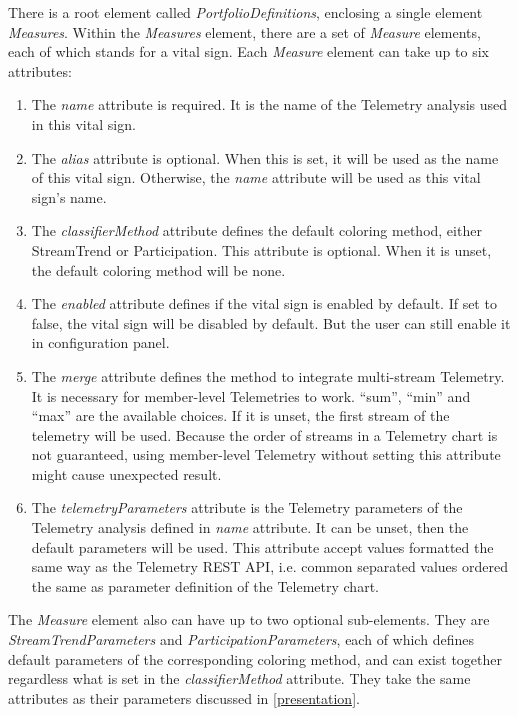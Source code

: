 There is a root element called {\it PortfolioDefinitions}, enclosing a single element {\it Measures}. Within the {\it Measures} element, there are a set of {\it Measure} elements, each of which stands for a vital sign. Each {\it Measure} element can take up to six attributes:
\begin{enumerate}
\item The {\it name} attribute is required. It is the name of the Telemetry analysis used in this vital sign.
\item The {\it alias} attribute is optional. When this is set, it will be used as the name of this vital sign. Otherwise, the {\it name} attribute will be used as this vital sign's name.
\item The {\it classifierMethod} attribute defines the default coloring method, either StreamTrend or Participation. This attribute is optional. When it is unset, the default coloring method will be none.
\item The {\it enabled} attribute defines if the vital sign is enabled by default. If set to false, the vital sign will be disabled by default. But the user can still enable it in configuration panel.
\item The {\it merge} attribute defines the method to integrate multi-stream Telemetry. It is necessary for member-level Telemetries to work. ``sum'', ``min'' and ``max'' are the available choices. If it is unset, the first stream of the telemetry will be used. Because the order of streams in a Telemetry chart is not guaranteed, using member-level Telemetry without setting this attribute might cause unexpected result.
\item The {\it telemetryParameters} attribute is the Telemetry parameters of the Telemetry analysis defined in {\it name} attribute. It can be unset, then the default parameters will be used. This attribute accept values formatted the same way as the Telemetry REST API, i.e. common separated values ordered the same as parameter definition of the Telemetry chart.
\end{enumerate}

The {\it Measure} element also can have up to two optional sub-elements. They are {\it StreamTrendParameters} and {\it ParticipationParameters}, each of which defines default parameters of the corresponding coloring method, and can exist together regardless what is set in the {\it classifierMethod} attribute. They take the same attributes as their parameters discussed in \autoref{presentation}.


